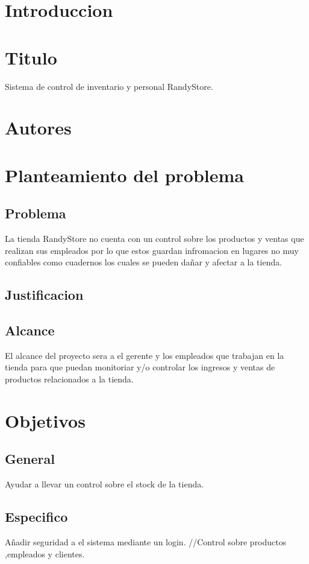 \documentclass[12pt,letterpaper]{article}
\begin{document}
\section{Introduccion} 

\section{Titulo} 

Sistema de control de inventario y personal RandyStore.


\section{Autores} 


\section{Planteamiento del problema} 
    \subsection{Problema}
    La tienda RandyStore no cuenta con un control sobre los productos y ventas que realizan sus empleados   
    por lo que estos guardan infromacion en lugares no muy confiables como cuadernos los cuales se pueden dañar 
    y afectar a la tienda.
    \subsection{Justificacion}
    
    \subsection{Alcance}
    El alcance del proyecto sera a el gerente y los empleados que trabajan en la tienda para que puedan monitoriar
    y/o controlar los ingresos y ventas de productos relacionados a la tienda.
\section{Objetivos}
    \subsection{General}
    Ayudar a llevar un control sobre el stock de la tienda.
    \subsection{Especifico}
    Añadir seguridad a el sistema mediante un login.
    //Control sobre productos ,empleados y clientes.
\end{document}
